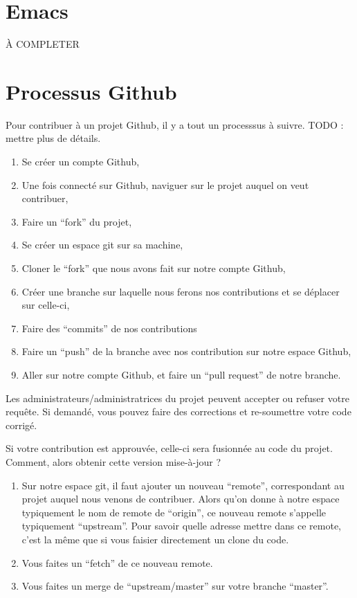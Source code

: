 \documentclass[12pt,oneside,final]{article}
\begin{document}
\section{Emacs}
À COMPLETER

\newpage
\section{Processus Github}
Pour contribuer \`{a} un projet Github, il y a tout un processsus \`{a} suivre.
TODO : mettre plus de détails.
\begin{enumerate}[1]
\item Se cr\'{e}er un compte Github,
\item Une fois connect\'{e} sur Github, naviguer sur le projet auquel on veut contribuer,
\item Faire un ``fork'' du projet,
\item Se créer un espace git sur sa machine,
\item Cloner le ``fork'' que nous avons fait sur notre compte Github,
\item Créer une branche sur laquelle nous ferons nos contributions et se déplacer sur celle-ci,
\item Faire des ``commits'' de nos contributions
\item Faire un ``push'' de la branche avec nos contribution sur notre espace Github,
\item Aller sur notre compte Github, et faire un ``pull request'' de notre branche.
\end{enumerate}

Les administrateurs/administratrices du projet peuvent accepter ou refuser votre requête. Si demandé, vous pouvez faire des corrections et re-soumettre votre code corrigé.

Si votre contribution est approuvée, celle-ci sera fusionnée au code du projet. Comment, alors obtenir cette version mise-à-jour ? 

\begin{enumerate}[1]
\item Sur notre espace git, il faut ajouter un nouveau ``remote'', correspondant au projet auquel nous venons de contribuer. Alors qu'on donne à notre espace typiquement le nom de remote de ``origin'', ce nouveau remote s'appelle typiquement ``upstream''. Pour savoir quelle adresse mettre dans ce remote, c'est la même que si vous faisier directement un clone du code.
\item Vous faites un ``fetch'' de ce nouveau remote.
\item Vous faites un merge de ``upstream/master'' sur votre branche ``master''.
\end{enumerate}
\end{document}

